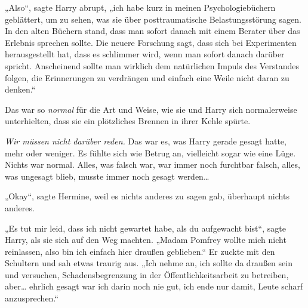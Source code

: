 „Also“, sagte Harry abrupt, „ich habe kurz in meinen Psychologiebüchern geblättert, um zu sehen, was sie über posttraumatische Belastungsstörung sagen. In den alten Büchern stand, dass man sofort danach mit einem Berater über das Erlebnis sprechen sollte. Die neuere Forschung sagt, dass sich bei Experimenten herausgestellt hat, dass es schlimmer wird, wenn man sofort danach darüber spricht. Anscheinend sollte man wirklich dem natürlichen Impuls des Verstandes folgen, die Erinnerungen zu verdrängen und einfach eine Weile nicht daran zu denken.“

Das war so \emph{normal} für die Art und Weise, wie sie und Harry sich normalerweise unterhielten, dass sie ein plötzliches Brennen in ihrer Kehle spürte.

\emph{Wir müssen nicht darüber reden.} Das war es, was Harry gerade gesagt hatte, mehr oder weniger. Es fühlte sich wie Betrug an, vielleicht sogar wie eine Lüge. Nichts war normal. Alles, was falsch war, war immer noch furchtbar falsch, alles, was ungesagt blieb, musste immer noch gesagt werden…

„Okay“, sagte Hermine, weil es nichts anderes zu sagen gab, überhaupt nichts anderes.

„Es tut mir leid, dass ich nicht gewartet habe, als du aufgewacht bist“, sagte Harry, als sie sich auf den Weg machten. „Madam Pomfrey wollte mich nicht reinlassen, also bin ich einfach hier draußen geblieben.“ Er zuckte mit den Schultern und sah etwas traurig aus. „Ich nehme an, ich sollte da draußen sein und versuchen, Schadensbegrenzung in der Öffentlichkeitsarbeit zu betreiben, aber… ehrlich gesagt war ich darin noch nie gut, ich ende nur damit, Leute scharf anzusprechen.“

